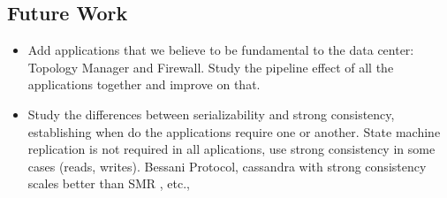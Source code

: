 \subsection{Future Work}
\begin{itemize}
\item Add applications that we believe to be fundamental to the data center: Topology Manager and Firewall.  Study the pipeline effect of all the applications together and improve on that. 
\item Study the differences between serializability and strong consistency, establishing when do the applications require one or another. State machine replication is not required in all aplications, use strong consistency in some cases (reads, writes). Bessani Protocol, cassandra with strong consistency scales better than SMR , etc., 
\end{itemize}